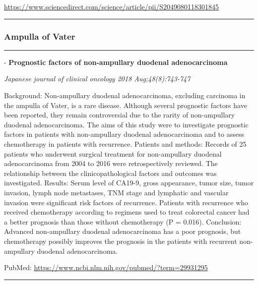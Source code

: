 \documentclass[]{article}
\begin{document}
\url{https://www.sciencedirect.com/science/article/pii/S2049080118301845}

\begin{center}\rule{0.5\linewidth}{\linethickness}\end{center}

\hypertarget{ampulla-of-vater-3}{%
\subsubsection{Ampulla of Vater}\label{ampulla-of-vater-3}}

\begin{center}\rule{0.5\linewidth}{\linethickness}\end{center}

 - \textbf{Prognostic factors of non-ampullary duodenal adenocarcinoma}

\emph{Japanese journal of clinical oncology 2018 Aug;48(8):743-747}

Background: Non-ampullary duodenal adenocarcinoma, excluding carcinoma
in the ampulla of Vater, is a rare disease. Although several prognostic
factors have been reported, they remain controversial due to the rarity
of non-ampullary duodenal adenocarcinoma. The aims of this study were to
investigate prognostic factors in patients with non-ampullary duodenal
adenocarcinoma and to assess chemotherapy in patients with recurrence.
Patients and methods: Records of 25 patients who underwent surgical
treatment for non-ampullary duodenal adenocarcinoma from 2004 to 2016
were retrospectively reviewed. The relationship between the
clinicopathological factors and outcomes was investigated. Results:
Serum level of CA19-9, gross appearance, tumor size, tumor invasion,
lymph node metastases, TNM stage and lymphatic and vascular invasion
were significant risk factors of recurrence. Patients with recurrence
who received chemotherapy according to regimens used to treat colorectal
cancer had a better prognosis than those without chemotherapy (P =
0.016). Conclusion: Advanced non-ampullary duodenal adenocarcinoma has a
poor prognosis, but chemotherapy possibly improves the prognosis in the
patients with recurrent non-ampullary duodenal adenocarcinoma.

PubMed: \url{https://www.ncbi.nlm.nih.gov/pubmed/?term=29931295}

{}

{}

\begin{center}\rule{0.5\linewidth}{\linethickness}\end{center}
\end{document}
